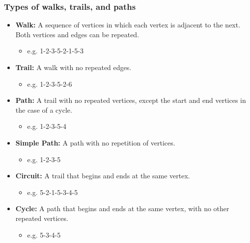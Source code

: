 \subsubsection{Types of walks, trails, and paths}
\begin{terminology}
    \begin{itemize}
        \item \textbf{Walk:} A sequence of vertices in which each vertex is adjacent to the next. Both vertices and edges can be repeated.
        \begin{itemize}
            \item e.g. 1-2-3-5-2-1-5-3
        \end{itemize}
        
        \item \textbf{Trail:} A walk with no repeated edges.
        \begin{itemize}
            \item e.g. 1-2-3-5-2-6
        \end{itemize}
        
        \item \textbf{Path:} A trail with no repeated vertices, except the start and end vertices in the case of a cycle.
        \begin{itemize}
            \item e.g. 1-2-3-5-4
        \end{itemize}
        
        \item \textbf{Simple Path:} A path with no repetition of vertices.
        \begin{itemize}
            \item e.g. 1-2-3-5
        \end{itemize}
        
        \item \textbf{Circuit:} A trail that begins and ends at the same vertex.
        \begin{itemize}
            \item e.g. 5-2-1-5-3-4-5
        \end{itemize}
        
        \item \textbf{Cycle:} A path that begins and ends at the same vertex, with no other repeated vertices.
        \begin{itemize}
            \item e.g. 5-3-4-5
        \end{itemize}
        
    \end{itemize}
\end{terminology}


